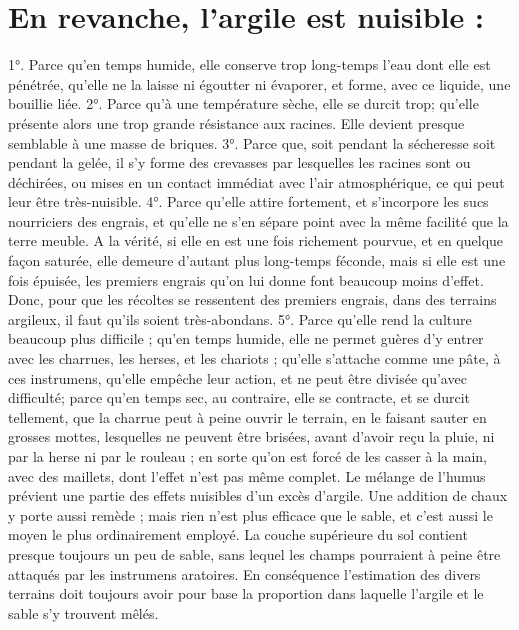 \section{En revanche, l'argile est nuisible :}
1°. Parce qu'en temps humide, elle conserve trop long-temps l'eau dont elle est pénétrée, qu'elle ne la laisse ni égoutter ni évaporer, et forme, avec ce liquide, une bouillie liée.
2°. Parce qu'à une température sèche, elle se durcit trop; qu'elle présente alors une trop grande résistance aux racines. Elle devient presque semblable à une masse de briques.\setcounter{page}{110} 3°. Parce que, soit pendant la sécheresse soit pendant la gelée, il s'y forme des crevasses par lesquelles les racines sont ou déchirées, ou mises en un contact immédiat avec l'air atmosphérique, ce qui peut leur être très-nuisible.
4°. Parce qu'elle attire fortement, et s'incorpore les sucs nourriciers des engrais, et qu'elle ne s'en sépare point avec la même facilité que la terre meuble. A la vérité, si elle en est une fois richement pourvue, et en quelque façon saturée, elle demeure d'autant plus long-temps féconde, mais si elle est une fois épuisée, les premiers engrais qu'on lui donne font beaucoup moins d'effet. Donc, pour que les récoltes se ressentent des premiers engrais, dans des terrains argileux, il faut qu'ils soient très-abondans.
5°. Parce qu'elle rend la culture beaucoup plus difficile ; qu'en temps humide, elle ne permet guères d'y entrer avec les charrues, les herses, et les chariots ; qu'elle s'attache comme une pâte, à ces instrumens, qu'elle empêche leur action, et ne peut être divisée qu'avec difficulté; parce qu'en temps sec, au contraire, elle se contracte, et se durcit tellement, que la charrue peut à peine ouvrir le terrain, en le faisant sauter en grosses mottes, lesquelles ne peuvent être\setcounter{page}{111} brisées, avant d'avoir reçu la pluie, ni par la herse ni par le rouleau ; en sorte qu'on est forcé de les casser à la main, avec des maillets, dont l'effet n'est pas même complet.
Le mélange de l'humus prévient une partie des effets nuisibles d'un excès d'argile. Une addition de chaux y porte aussi remède ; mais rien n'est plus efficace que le sable, et c'est aussi le moyen le plus ordinairement employé. La couche supérieure du sol contient presque toujours un peu de sable, sans lequel les champs pourraient à peine être attaqués par les instrumens aratoires. En conséquence l'estimation des divers terrains doit toujours avoir pour base la proportion dans laquelle l'argile et le sable s'y trouvent mêlés.
